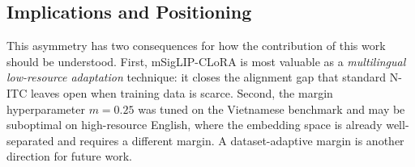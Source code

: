 \documentclass[../main.tex]{subfiles}
\begin{document}
\subsection*{Implications and Positioning}

This asymmetry has two consequences for how the contribution of this work should be understood. First, mSigLIP-CLoRA is most valuable as a \textit{multilingual low-resource adaptation} technique: it closes the alignment gap that standard N-ITC leaves open when training data is scarce. Second, the margin hyperparameter $m{=}0.25$ was tuned on the Vietnamese benchmark and may be suboptimal on high-resource English, where the embedding space is already well-separated and requires a different margin. A dataset-adaptive margin is another direction for future work.
\end{document}
